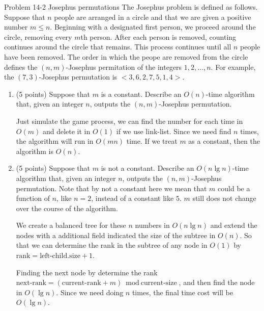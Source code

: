 \documentclass[paper=a4, fontsize=11pt]{scrartcl} %
\begin{document}
\begin{fancyquotes}
  Problem 14-2 Josephus permutations The Josephus problem is defined
  as follows. Suppose that $n$ people are arranged in a circle and
  that we are given a positive number $m\leq n$. Beginning with a
  designated first person, we proceed around the circle, removing
  every $m$th person. After each person is removed, counting continues
  around the circle that remains. This process continues until all $n$
  people have been removed. The order in which the peope are removed
  from the circle defines the $(n,m)$-Josephus permitation of the
  integers $1,2,\ldots,n$. For example, the $(7,3)$-Josephus
  permutation is $<3,6,2,7,5,1,4>$.
\end{fancyquotes}

\begin{enumerate}
\item
  \begin{fancyquotes}
    (5 points) Suppose that $m$ is a constant. Describe an $O(n)$-time
    algorithm that, given an integer $n$, outputs the $(n,m)$-Josephus
    permutation.
  \end{fancyquotes}

  Just simulate the game process, we can find the number for each time
  in $O(m)$ and delete it in $O(1)$ if we use link-list. Since we need
  find $n$ times, the algorithm will run in $O(mn)$ time. If we treat
  $m$ as a constant, then the algorithm is $O(n)$.

\item
  \begin{fancyquotes}
    (5 points) Suppose that $m$ is not a constant. Describe an
    $O(n\lg{n})$-time algorithm that, given an integer $n$, outputs
    the $(n,m)$-Josephus permutation. Note that by not a constant
    here we mean that $m$ could be a function of $n$, like $n=2$,
    instead of a constant like $5$. $m$ still does not change over the
    course of the algorithm.
  \end{fancyquotes}

  We create a balanced tree for these $n$ numbers in $O(n\lg{n})$ and
  extend the nodes with a additional field indicated the size of the
  subtree in $O(n)$. So that we can determine the rank in the subtree
  of any node in $O(1)$ by $\text{rank} = \text{left-child}.\text{size}+1$.

  Finding the next node by determine the rank $\text{next-rank} =
  (\text{current-rank} + m) \bmod \text{current-size}$, and then find
  the node in $O(\lg{n})$. Since we need doing $n$ times, the final
  time cost will be $O(\lg{n})$.


\end{enumerate}


\end{document}
